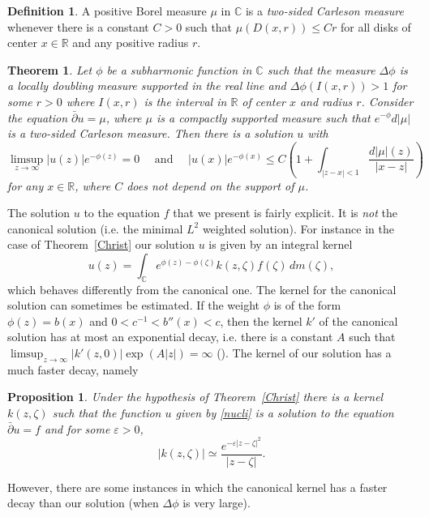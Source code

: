 \documentclass[12pt,twoside,final,psamsfonts]{amsart}
\theoremstyle{plain}
\newtheorem{teor}{Theorem}
\newtheorem{prop}{Proposition}
\theoremstyle{remark}
\theoremstyle{definition}
\newtheorem*{defi}{Definition}
\newcommand{\C}{{\mathbb C}}
\newcommand{\R}{{\mathbb R}}
\newcommand{\dbar}{\bar\partial}
\begin{document}
\begin{defi} 
A positive Borel measure $\mu$ in $\C$ is a \emph{two-sided Carleson measure} 
whenever there is a
constant $C>0$ such that $\mu(D(x,r))\le C r$ for all disks of center
$x\in\R$ and any positive radius $r$.  
\end{defi}

\begin{teor}\label{degenerat}
Let $\phi$ be a subharmonic function in $\C$ such that the measure $\Delta
\phi$ is a locally 
doubling measure supported in the real line and  $\Delta \phi
(I(x,r))>1$ for some $r>0$ where $I(x,r)$ is the interval in $\R$ of center $x$
and radius $r$. Consider the equation $\dbar u=\mu$, where $\mu$ is a compactly
supported measure such that $e^{-\phi}d|\mu|$ is a two-sided  Carleson measure.
Then there is a solution $u$ with
\[
\limsup_{z\to\infty} |u(z)|e^{-\phi(z)}=0 \quad \text{ and } \quad
|u(x)|e^{-\phi(x)}\le C \left(1+ \int_{|z-x|<1}\frac {d|\mu|(z)}{|x-z|}\right)
\]
for any $x\in \R$, where $C$ does not depend on the support of $\mu$.
\end{teor}


The solution $u$ to the equation $f$ that we present is fairly explicit. It is
\emph{not} the canonical solution (i.e. the minimal $L^2$ weighted solution).
For instance in the case of Theorem~\ref{Christ} our
solution $u$ is given by an integral kernel
\begin{equation}\label{nucli}
u(z)=\int_\C e^{\phi(z)-\phi(\zeta)}k(z,\zeta) f(\zeta)\, dm(\zeta),
\end{equation}
which behaves differently from the canonical one. The kernel for the canonical
solution can sometimes be estimated. If the weight $\phi$ is of the form
$\phi(z)=b(x)$ and $0<c^{-1}<b''(x) <c$, then the kernel $k'$ of the canonical
solution has at most an exponential decay, i.e. there is a constant $A$ such
that $\limsup_{z\to\infty} |k'(z,0)|\exp(A|z|)=\infty$ 
(\cite[Proposition~1.18]{Christ91}). 
The kernel of our
solution has a much faster decay, namely 
\begin{prop}\label{churrimangui} 
Under the hypothesis of Theorem~\ref{Christ} there is a kernel
$k(z,\zeta)$ such that the function $u$ given by \eqref{nucli} is a solution to
the equation $\dbar u= f$ and for some $\varepsilon>0$,
\[
|k(z,\zeta)|\simeq \frac{e^{-\varepsilon |z-\zeta|^2}}{|z-\zeta|}.
\] 
\end{prop}
However, there are some instances in which the canonical kernel has a faster
decay than our solution (when $\Delta \phi$ is very large). 
\end{document}
